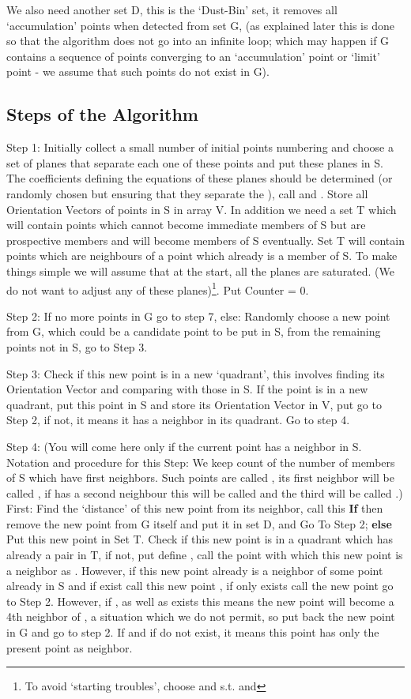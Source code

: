 \documentclass[english]{article}
\begin{document}
We also need another set D, this is the `Dust-Bin' set, it removes
all `accumulation' points when detected from set G, (as explained
later this is done so that the algorithm does not go into an infinite
loop; which may happen if G contains a sequence of points converging to an `accumulation' point or `limit' point - we assume that such points do not exist in G).

\medskip{}



\subsection{Steps of the Algorithm}

Step 1: Initially collect a small number of initial points numbering
 and choose a set of  planes that separate each one
of these  points and put these planes in S. The coefficients
defining the equations of these  planes should be determined
(or randomly chosen but ensuring that they separate the ),
call  and . Store all Orientation Vectors of points
in S in array V. In addition we need a set T which will contain points
which cannot become immediate members of S but are prospective members
and will become members of S eventually. Set T will contain points
which are neighbours of a point which already is a member of S. To
make things simple we will assume that at the start, all the 
planes are saturated. (We do not want to adjust any of these planes)\footnote{To avoid `starting troubles', choose  and  s.t. 
and }. Put Counter = 0.

Step 2: If no more points in G go to step 7, else: Randomly choose
a new point from G, which could be a candidate point to be put in
S, from the remaining points not in S, go to Step 3.

Step 3: Check if this new point is in a new `quadrant', this involves
finding its Orientation Vector and comparing with those in S. If the
point is in a new quadrant, put this point in S and store its Orientation
Vector in V, put  go to Step 2, if not, it means it has a
neighbor in its quadrant. Go to step 4.

Step 4: (You will come here only if the current point has a neighbor
in S. Notation and procedure for this Step: We keep count of the number
of members of S which have first neighbors. Such points are called ,
its first neighbor will be called , if  has a second
neighbour this will be called  and the third will be called
 .) First: Find the `distance' of this new point from its neighbor, call this \textbf{If} 
then remove the new point from G itself and put it in set D, and Go To Step
2; \textbf{else} Put this new point in Set T. Check if this new point is in a quadrant which has already a pair in T, if not, put  define , call the point with which this new point is a neighbor as . However, if this new point already is a neighbor of some point  already in S and if  exist call this new point , if only  exists call the new point  go to Step 2. However, if   ,  as well as  exists this means the new point will become a 4th neighbor of ,  a situation which we do not permit, so put back the new point in G and go to step 2. If  and if  do not exist, it means this point  has only the present point as neighbor. 
\end{document}
